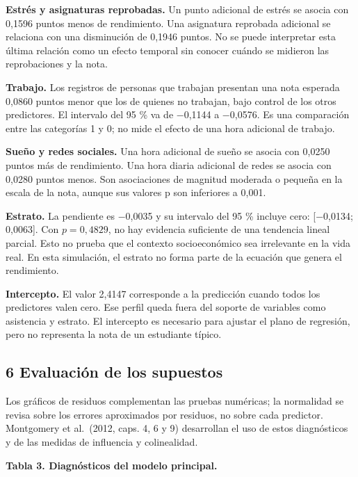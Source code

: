 \documentclass[
  11pt,
  letterpaper,
]{article}
\begin{document}
\textbf{Estrés y asignaturas reprobadas.} Un punto adicional de estrés
se asocia con 0,1596 puntos menos de rendimiento. Una asignatura
reprobada adicional se relaciona con una disminución de 0,1946 puntos.
No se puede interpretar esta última relación como un efecto temporal sin
conocer cuándo se midieron las reprobaciones y la nota.

\textbf{Trabajo.} Los registros de personas que trabajan presentan una
nota esperada 0,0860 puntos menor que los de quienes no trabajan, bajo
control de los otros predictores. El intervalo del 95 \% va de −0,1144 a
−0,0576. Es una comparación entre las categorías 1 y 0; no mide el
efecto de una hora adicional de trabajo.

\textbf{Sueño y redes sociales.} Una hora adicional de sueño se asocia
con 0,0250 puntos más de rendimiento. Una hora diaria adicional de redes
se asocia con 0,0280 puntos menos. Son asociaciones de magnitud moderada
o pequeña en la escala de la nota, aunque sus valores p son inferiores a
0,001.

\textbf{Estrato.} La pendiente es −0,0035 y su intervalo del 95 \%
incluye cero: {[}−0,0134; 0,0063{]}. Con \(p=0{,}4829\), no hay
evidencia suficiente de una tendencia lineal parcial. Esto no prueba que
el contexto socioeconómico sea irrelevante en la vida real. En esta
simulación, el estrato no forma parte de la ecuación que genera el
rendimiento.

\textbf{Intercepto.} El valor 2,4147 corresponde a la predicción cuando
todos los predictores valen cero. Ese perfil queda fuera del soporte de
variables como asistencia y estrato. El intercepto es necesario para
ajustar el plano de regresión, pero no representa la nota de un
estudiante típico.

\newpage

\hypertarget{evaluaciuxf3n-de-los-supuestos}{%
\subsection{6 Evaluación de los
supuestos}\label{evaluaciuxf3n-de-los-supuestos}}

Los gráficos de residuos complementan las pruebas numéricas; la
normalidad se revisa sobre los errores aproximados por residuos, no
sobre cada predictor. Montgomery et al.~(2012, caps. 4, 6 y 9)
desarrollan el uso de estos diagnósticos y de las medidas de influencia
y colinealidad.

\textbf{Tabla 3. Diagnósticos del modelo principal.}
\end{document}
